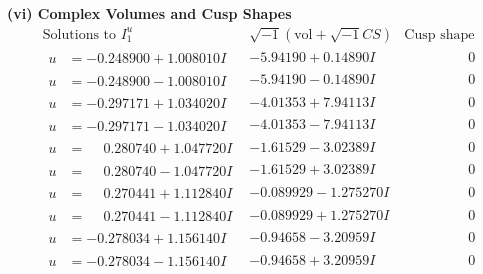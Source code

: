 \documentclass[1p]{elsarticle_modified}
\theoremstyle{definition}
\newcommand{\I}{\sqrt{-1}}
\begin{document}
\newpage\flushleft \textbf{(vi) Complex Volumes and Cusp Shapes}
$$\begin{array}{c|c|c}  
\text{Solutions to }I^u_{1}& \I (\text{vol} + \sqrt{-1}CS) & \text{Cusp shape}\\
 \hline 
\begin{aligned}
u &= -0.248900 + 1.008010 I\end{aligned}
 & -5.94190 + 0.14890 I & \phantom{-0.000000 } 0 \\ \hline\begin{aligned}
u &= -0.248900 - 1.008010 I\end{aligned}
 & -5.94190 - 0.14890 I & \phantom{-0.000000 } 0 \\ \hline\begin{aligned}
u &= -0.297171 + 1.034020 I\end{aligned}
 & -4.01353 + 7.94113 I & \phantom{-0.000000 } 0 \\ \hline\begin{aligned}
u &= -0.297171 - 1.034020 I\end{aligned}
 & -4.01353 - 7.94113 I & \phantom{-0.000000 } 0 \\ \hline\begin{aligned}
u &= \phantom{-}0.280740 + 1.047720 I\end{aligned}
 & -1.61529 - 3.02389 I & \phantom{-0.000000 } 0 \\ \hline\begin{aligned}
u &= \phantom{-}0.280740 - 1.047720 I\end{aligned}
 & -1.61529 + 3.02389 I & \phantom{-0.000000 } 0 \\ \hline\begin{aligned}
u &= \phantom{-}0.270441 + 1.112840 I\end{aligned}
 & -0.089929 - 1.275270 I & \phantom{-0.000000 } 0 \\ \hline\begin{aligned}
u &= \phantom{-}0.270441 - 1.112840 I\end{aligned}
 & -0.089929 + 1.275270 I & \phantom{-0.000000 } 0 \\ \hline\begin{aligned}
u &= -0.278034 + 1.156140 I\end{aligned}
 & -0.94658 - 3.20959 I & \phantom{-0.000000 } 0 \\ \hline\begin{aligned}
u &= -0.278034 - 1.156140 I\end{aligned}
 & -0.94658 + 3.20959 I & \phantom{-0.000000 } 0 \\ \hline\begin{aligned}

\end{aligned}
\end{array}$$
\end{document}
